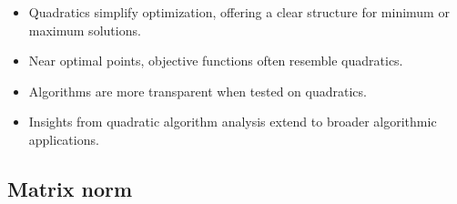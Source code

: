 \documentclass[12pt,thmsa]{article}
\begin{document}
\begin{itemize}
	\item Quadratics simplify optimization, offering a clear structure for minimum or maximum solutions.
	
	\item Near optimal points, objective functions often resemble quadratics.
	
	\item Algorithms are more transparent when tested on quadratics.
	
	\item Insights from quadratic algorithm analysis extend to broader algorithmic applications.
	
\end{itemize}

\subsection{Matrix norm}
\end{document}

